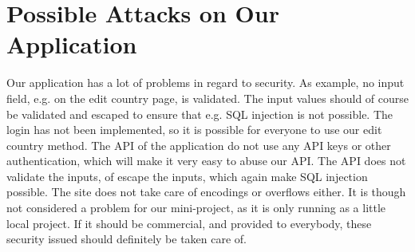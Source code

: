 \section{Possible Attacks on Our Application}
Our application has a lot of problems in regard to security.
As example, no input field, e.g. on the edit country page, is validated. The input values should of course be validated and escaped to ensure that e.g. SQL injection is not possible.
The login has not been implemented, so it is possible for everyone to use our edit country method. The API of the application do not use any API keys or other authentication, which will make it very easy to abuse our API. The API does not validate the inputs, of escape the inputs, which again make SQL injection possible.
The site does not take care of encodings or overflows either.
It is though not considered a problem for our mini-project, as it is only running as a little local project. If it should be commercial, and provided to everybody, these security issued should definitely be taken care of.